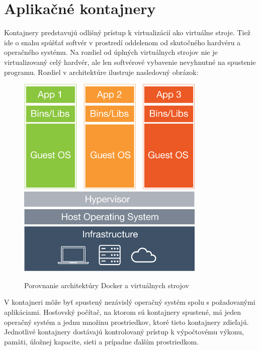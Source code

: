 \documentclass[11pt,final,oneside]{fithesis}
\begin{document}
\section{Aplikačné kontajnery}
Kontajnery predstavujú odlišný prístup k virtualizácií ako virtuálne stroje. Tiež ide o snahu spúšťať softvér v prostredí oddelenom od skutočného hardvéru a operačného systému. Na rozdiel od úplných virtuálnych strojov 
nie je virtualizovaný celý hardvér, ale len softvérové vybavenie nevyhnutné na spustenie programu. Rozdiel v architektúre ilustruje nasledovný obrázok: 
\begin{figure}[h]
\begin{center}
       \includegraphics[width=0.8\textwidth]{images/docker.png}
       \caption{Porovnanie architektúry Docker a virtuálnych strojov}\cite{docker}
\end{center}
\end{figure}
V kontajneri môže byť spustený nezávislý operačný systém spolu s požadovanými aplikáciami. Hosťovský počítač, na ktorom sú kontajnery spustené, má jeden operačný systém a jednu množinu prostriedkov, 
ktoré tieto kontajnery zdieľajú. Jednotlivé kontajnery dostávajú kontrolovaný prístup k výpočtovému výkonu, pamäti, úložnej kapacite, sieti a prípadne ďalším prostriedkom.
\end{document}
